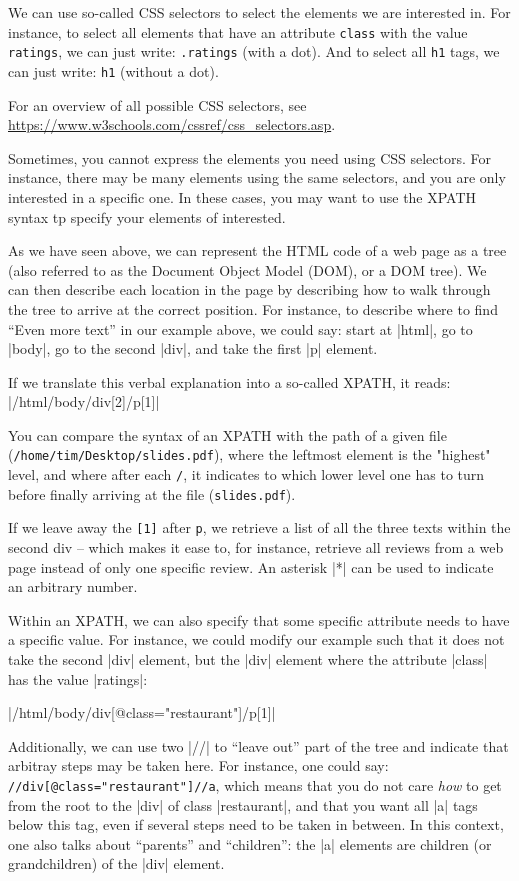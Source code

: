 We can use so-called CSS selectors to select the elements we are
interested in.  For instance, to select all elements that have an
attribute \texttt{class} with the value \texttt{ratings}, we can just
write: \texttt{.ratings} (with a dot).  And to select all \texttt{h1}
tags, we can just write: \texttt{h1} (without a dot).

For an overview of all possible CSS selectors, see
\url{https://www.w3schools.com/cssref/css_selectors.asp}.

Sometimes, you cannot express the elements you need using CSS
selectors. For instance, there may be many elements using the same
selectors, and you are only interested in a specific one. In these
cases, you may want to use the XPATH syntax tp specify your elements
of interested.

As we have seen above, we can represent the HTML code of a web page as
a tree (also referred to as the Document Object Model (DOM), or a DOM
tree). We can then describe each location in the page by describing
how to walk through the tree to arrive at the correct position.  For
instance, to describe where to find ``Even more text'' in our example
above, we could say: start at |html|, go to |body|, go to the second |div|,
and take the first |p| element.

If we translate this verbal explanation into a so-called XPATH, it reads:
|/html/body/div[2]/p[1]|

 You can compare the syntax of an XPATH with the path of a given file
 (\texttt{/home/tim/Desktop/slides.pdf}), where the leftmost element
 is the "highest" level, and where after each \texttt{/}, it indicates
 to which lower level one has to turn before finally arriving at the
 file (\texttt{slides.pdf}).

If we leave away the \texttt{[1]} after \texttt{p}, we retrieve a list
of all the three texts within the second div -- which makes it ease
to, for instance, retrieve all reviews from a web page instead of only
one specific review. An asterisk |*| can be used to indicate an
arbitrary number.

Within an XPATH, we can also specify that some specific attribute
needs to have a specific value. For instance, we could modify our
example such that it does not take the second |div| element, but the
|div| element where the attribute |class| has the value |ratings|:

|/html/body/div[@class="restaurant"]/p[1]|

Additionally, we can use two |//| to ``leave out'' part of the tree
and indicate that arbitray steps may be taken here. For instance, one
could say: \texttt{//div[@class="restaurant"]//a}, which means that
you do not care \emph{how} to get from the root to the |div| of class
|restaurant|, and that you want all |a| tags below this tag, even if
several steps need to be taken in between. In this context, one also
talks about ``parents'' and ``children'': the |a| elements are
children (or grandchildren) of the |div| element.


